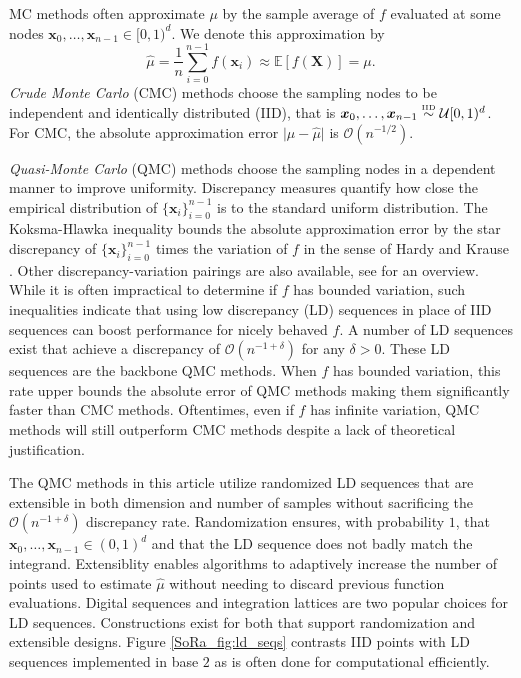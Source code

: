 \documentclass[graybox]{svmult}
\begin{document}
MC methods often approximate $\mu$ by the sample average of $f$ evaluated at some nodes $\boldsymbol{x}_0,\dots,\boldsymbol{x}_{n-1} \in [0,1)^d$. We denote this approximation by  
\begin{equation}
    \label{SoRa_eq:mcapprox}
    \hat{\mu} = \frac{1}{n}\sum_{i=0}^{n-1} f(\boldsymbol{x}_i) \approx \mathbb{E}[f(\boldsymbol{X})] = \mu. 
\end{equation}
\emph{Crude Monte Carlo} (CMC) methods choose the sampling nodes to be independent and identically distributed (IID), that is $\boldsymbol{x}_0,\dots,\boldsymbol{x}_{n-1} \overset{\text{\tiny IID}}{\sim} \mathcal{U}[0,1)^{d}$. For CMC, the absolute approximation error $\lvert \mu - \hat{\mu} \rvert$ is $\mathcal{O}(n^{-1/2})$. 

\emph{Quasi-Monte Carlo} (QMC) methods choose the sampling nodes in a dependent manner to improve uniformity. Discrepancy measures quantify how close the empirical distribution of $\{\boldsymbol{x}_i\}_{i=0}^{n-1}$ is to the standard uniform distribution. The Koksma-Hlawka inequality bounds the absolute approximation error by the star discrepancy of $\{\boldsymbol{x}_i\}_{i=0}^{n-1}$ times the variation of $f$ in the sense of Hardy and Krause \cite{dick2013high}. Other discrepancy-variation pairings are also available, see \cite{hickernell1998generalized} for an overview. While it is often impractical to determine if $f$ has bounded variation, such inequalities indicate that using low discrepancy (LD) sequences in place of IID sequences can boost performance for nicely behaved $f$. A number of LD sequences exist that achieve a discrepancy of $\mathcal{O}(n^{-1+\delta})$ for any $\delta > 0$. These LD sequences are the backbone QMC methods. When $f$ has bounded variation, this rate upper bounds the absolute error of QMC methods making them significantly faster than CMC methods. Oftentimes, even if $f$ has infinite variation, QMC methods will still outperform CMC methods despite a lack of theoretical justification. 

The QMC methods in this article utilize randomized LD sequences that are extensible in both dimension and number of samples without sacrificing the $\mathcal{O}(n^{-1+\delta})$ discrepancy rate. Randomization ensures, with probability $1$, that $\boldsymbol{x}_0,\dots,\boldsymbol{x}_{n-1} \in (0,1)^d$ and that the LD sequence does not badly match the integrand. Extensiblity enables algorithms to adaptively increase the number of points used to estimate $\hat{\mu}$ without needing to discard previous function evaluations. Digital sequences and integration lattices are two popular choices for LD sequences. Constructions exist for both that support randomization and extensible designs. Figure \ref{SoRa_fig:ld_seqs} contrasts IID points with LD sequences implemented in base $2$ as is often done for computational efficiently.
\end{document}
